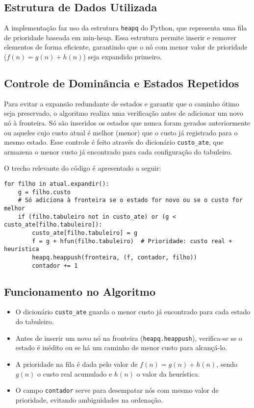 \subsection{Estrutura de Dados Utilizada}  
A implementação faz uso da estrutura \texttt{heapq} do Python, que representa uma fila de prioridade baseada em min-heap. Essa estrutura permite inserir e remover elementos de forma eficiente, garantindo que o nó com menor valor de prioridade ($f(n) = g(n) + h(n)$) seja expandido primeiro.  

\subsection{Controle de Dominância e Estados Repetidos}  
Para evitar a expansão redundante de estados e garantir que o caminho ótimo seja preservado, o algoritmo realiza uma verificação antes de adicionar um novo nó à fronteira. Só são inseridos os estados que nunca foram gerados anteriormente ou aqueles cujo custo atual é melhor (menor) que o custo já registrado para o mesmo estado. Esse controle é feito através do dicionário \texttt{custo\_ate}, que armazena o menor custo já encontrado para cada configuração do tabuleiro.  

O trecho relevante do código é apresentado a seguir:  

\begin{verbatim}  
for filho in atual.expandir():  
    g = filho.custo  
    # Só adiciona à fronteira se o estado for novo ou se o custo for melhor  
    if (filho.tabuleiro not in custo_ate) or (g < custo_ate[filho.tabuleiro]):  
        custo_ate[filho.tabuleiro] = g  
        f = g + hfun(filho.tabuleiro)  # Prioridade: custo real + heurística  
        heapq.heappush(fronteira, (f, contador, filho))  
        contador += 1  
\end{verbatim}  

\subsection{Funcionamento no Algoritmo}  
\begin{itemize}  
    \item O dicionário \texttt{custo\_ate} guarda o menor custo já encontrado para cada estado do tabuleiro.  
    \item Antes de inserir um novo nó na fronteira (\texttt{heapq.heappush}), verifica-se se o estado é inédito ou se há um caminho de menor custo para alcançá-lo.  
    \item A prioridade na fila é dada pelo valor de $f(n) = g(n) + h(n)$, sendo $g(n)$ o custo real acumulado e $h(n)$ o valor da heurística.  
    \item O campo \texttt{contador} serve para desempatar nós com mesmo valor de prioridade, evitando ambiguidades na ordenação.  
\end{itemize}  

